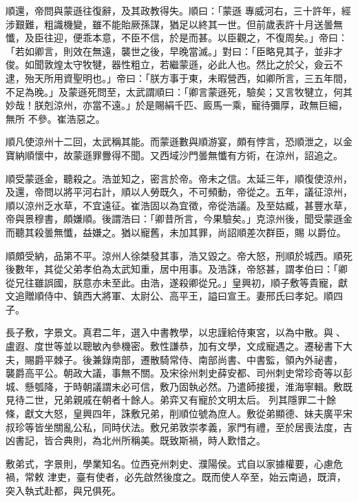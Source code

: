 \begin{pinyinscope}
 順還，帝問與蒙遜往復辭，及其政教得失。順曰：「蒙遜
 專威河右，三十許年，經涉艱難，粗識機變，雖不能貽厥孫謀，猶足以終其一世。但前歲表許十月送曇無懺，及臣往迎，便乖本意，不臣不信，於是而甚。以臣觀之，不復周矣。」帝曰：「若如卿言，則效在無遠，襲世之後，早晚當滅。」對曰：「臣略見其子，並非才俊。如聞敦煌太守牧犍，器性粗立，若繼蒙遜，必此人也。然比之於父，僉云不逮，殆天所用資聖明也。」帝曰：「朕方事于東，未暇營西，如卿所言，三五年間，不足為晚。」及蒙遜死問至，太武謂順曰：「卿言蒙遜死，驗矣；又言牧犍立，何其妙哉！朕剋涼州，亦當不遠。」於是賜絹千匹、廄馬一乘，寵待彌厚，政無巨細，無所
 不參。崔浩惡之。



 順凡使涼州十二回，太武稱其能。而蒙遜數與順游宴，頗有悖言，恐順泄之，以金寶納順懷中，故蒙遜罪釁得不聞。又西域沙門曇無懺有方術，在涼州，詔追之。



 順受蒙遜金，聽殺之。浩並知之，密言於帝。帝未之信。太延三年，順復使涼州，及還，帝問以將平河右計，順以人勞既久，不可頻動，帝從之。五年，議征涼州，順以涼州乏水草，不宜遠征。崔浩固以為宜徵，帝從浩議。及至姑臧，甚豐水草，帝與景穆書，頗嫌順。後謂浩曰：「卿昔所言，今果驗矣。」克涼州後，聞受蒙遜金而聽其殺曇無懺，益嫌之。猶以寵舊，未加其罪，尚詔順差次群臣，賜
 以爵位。



 順頗受納，品第不平。涼州人徐桀發其事，浩又毀之。帝大怒，刑順於城西。順死後數年，其從父弟孝伯為太武知重，居中用事。及浩誅，帝怒甚，謂孝伯曰：「卿從兄往雖誤國，朕意亦未至此。由浩，遂殺卿從兄。」皇興初，順子敷等貴寵，獻文追贈順侍中、鎮西大將軍、太尉公、高平王，謚曰宣王。妻邢氏曰孝妃。順四子。



 長子敷，字景文。真君二年，選入中書教學，以忠謹給侍東宮，以為中散。與、盧遐、度世等並以聰敏內參機密。敷性謙恭，加有文學，文成寵遇之。遷秘書下大夫，賜爵平棘子。後兼錄南部，遷散騎常侍、南部尚書、中書監，領內外祕書，
 襲爵高平公。朝政大議，事無不關。及宋徐州刺史薛安都、司州刺史常珍奇等以彭城、懸瓠降，于時朝議謂未必可信，敷乃固執必然。乃遣師接援，淮海寧輯。敷既見待二世，兄弟親戚在朝者十餘人。弟弈又有寵於文明太后。列其隱罪二十餘條，獻文大怒，皇興四年，誅敷兄弟，削順位號為庶人。敷從弟顯德、妹夫廣平宋叔珍等皆坐關亂公私，同時伏法。敷兄弟敦崇孝義，家門有禮，至於居喪法度，吉凶書記，皆合典則，為北州所稱美。既致斯禍，時人歎惜之。



 敷弟式，字景則，學業知名。位西兗州刺史、濮陽侯。式自以家據權要，心慮危禍，常敕
 津吏，臺有使者，必先啟然後度之。既而使人卒至，始云南過，既濟，突入執式赴都，與兄俱死。




\end{pinyinscope}
